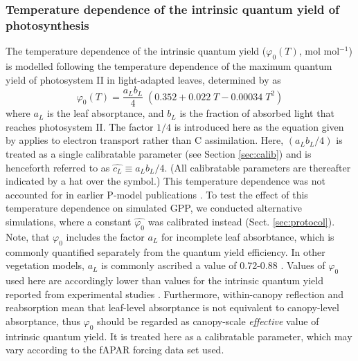 \documentclass{myreport}
\begin{document}
\subsubsection{Temperature dependence of the intrinsic quantum yield of photosynthesis}
\label{sec:tempstress}
The temperature dependence of the intrinsic quantum yield ($\varphi_0(T)$, mol mol$^{-1}$) is modelled following the temperature dependence of the maximum quantum yield of photosystem II in light-adapted leaves, determined by \citet{bernacchi03pce} as 
\begin{equation}
\label{eq:bernacchi03}
\varphi_0(T) = \frac{a_L b_L}{4} \; ( 0.352 + 0.022\;T - 0.00034\;T^2 )
\end{equation}
where $a_L$ is the leaf absorptance, and $b_L$ is the fraction of absorbed light that reaches photosystem II. The factor $1/4$ is introduced here as the equation given by \citet{bernacchi03pce} applies to electron transport rather than C assimilation. Here, $(a_L b_L / 4)$ is treated as a single calibratable parameter (see Section \ref{sec:calib}) and is henceforth referred to as $\widehat{c_L}\equiv a_L b_L / 4$. (All calibratable parameters are thereafter indicated by a hat over the symbol.) This temperature dependence was not accounted for in earlier P-model publications \citep{keenan17natcomm, wang17natpl}. To test the effect of this temperature dependence on simulated GPP, we conducted alternative simulations, where a constant $\widehat{\varphi_0}$ was calibrated instead (Sect. \ref{sec:protocol}). Note, that $\varphi_0$ includes the factor $a_L$ for incomplete leaf absorbtance, which is commonly quantified separately from the quantum yield efficiency. In other vegetation models, $a_L$ is commonly ascribed a value of 0.72-0.88 \citep{rogers17}. Values of $\varphi_0$ used here are accordingly lower than values for the intrinsic quantum yield reported from experimental studies \citep{long93, singsaas01}. Furthermore, within-canopy reflection and reabsorption mean that leaf-level absorptance is not equivalent to canopy-level absorptance, thus $\varphi_0$ should be regarded as canopy-scale \textit{effective} value of intrinsic quantum yield. It is treated here as a calibratable parameter, which may vary according to the fAPAR forcing data set used. 
\end{document}
